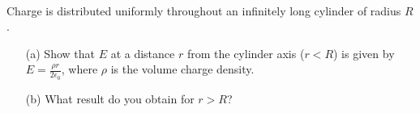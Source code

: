 \documentclass[11pt,letterpaper,boxed]{hmcpset}
\begin{document}
	\begin{solution}
		\vfill
	\end{solution}
	\newpage
	
	\begin{problem}[HRK E27.25]
	\\Charge is distributed uniformly throughout an infinitely long cylinder of radius $R$. 
		\begin{enumerate}
			\item[(a)] Show that $E$ at a distance $r$ from the cylinder axis ($r < R$) is given by $E = \frac{\rho r}{2\epsilon_0}$, where $\rho$ is the volume charge density.
			\item[(b)] What result do you obtain for $r > R$?
		\end{enumerate}
		
	\end{problem}
	
	\begin{solution}
		\vfill
	\end{solution}
	\newpage
	
	
\end{document}
